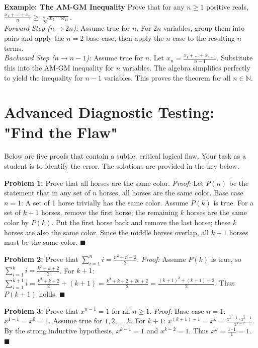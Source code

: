 \documentclass[11pt, a4paper]{article}
\theoremstyle{definition}
\theoremstyle{remark}
\newcommand{\N}{\mathbb{N}}
\begin{document}
\textbf{Example: The AM-GM Inequality}
Prove that for any $n \ge 1$ positive reals, $\frac{x_1 + \dots + x_n}{n} \ge \sqrt[n]{x_1 \cdots x_n}$.
\vspace{4pt} \\
\textit{Forward Step ($n \to 2n$):} Assume true for $n$. For $2n$ variables, group them into pairs and apply the $n=2$ base case, then apply the $n$ case to the resulting $n$ terms.
\vspace{4pt} \\
\textit{Backward Step ($n \to n-1$):} Assume true for $n$. Let $x_n = \frac{x_1 + \dots + x_{n-1}}{n-1}$. Substitute this into the AM-GM inequality for $n$ variables. The algebra simplifies perfectly to yield the inequality for $n-1$ variables. This proves the theorem for all $n \in \N$.

\section{Advanced Diagnostic Testing: "Find the Flaw"}

Below are five proofs that contain a subtle, critical logical flaw. Your task as a student is to identify the error. The solutions are provided in the key below.

\textbf{Problem 1:} Prove that all horses are the same color.
\textit{Proof:} Let $P(n)$ be the statement that in any set of $n$ horses, all horses are the same color. Base case $n=1$: A set of 1 horse trivially has the same color. Assume $P(k)$ is true. For a set of $k+1$ horses, remove the first horse; the remaining $k$ horses are the same color by $P(k)$. Put the first horse back and remove the last horse; these $k$ horses are also the same color. Since the middle horses overlap, all $k+1$ horses must be the same color. $\blacksquare$

\textbf{Problem 2:} Prove that $\sum_{i=1}^n i = \frac{n^2 + n + 2}{2}$.
\textit{Proof:} Assume $P(k)$ is true, so $\sum_{i=1}^k i = \frac{k^2 + k + 2}{2}$. For $k+1$:
$\sum_{i=1}^{k+1} i = \frac{k^2 + k + 2}{2} + (k+1) = \frac{k^2 + k + 2 + 2k + 2}{2} = \frac{(k+1)^2 + (k+1) + 2}{2}$. Thus $P(k+1)$ holds. $\blacksquare$

\textbf{Problem 3:} Prove that $x^{n-1} = 1$ for all $n \ge 1$.
\textit{Proof:} Base case $n=1$: $x^{1-1} = x^0 = 1$. Assume true for $1, 2, \dots, k$. For $k+1$: $x^{(k+1)-1} = x^k = \frac{x^{k-1} \cdot x^{k-1}}{x^{k-2}}$. By the strong inductive hypothesis, $x^{k-1} = 1$ and $x^{k-2} = 1$. Thus $x^k = \frac{1 \cdot 1}{1} = 1$. $\blacksquare$
\end{document}
